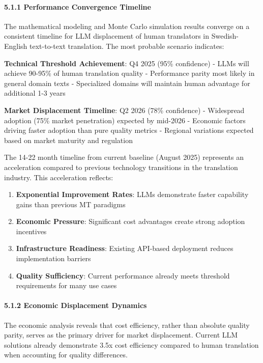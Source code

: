\documentclass[12pt,a4paper]{article}
\providecommand{\tightlist}{%
  \setlength{\itemsep}{0pt}\setlength{\parskip}{0pt}}
\begin{document}
{{{{\hypertarget{performance-convergence-timeline}{%
\paragraph{5.1.1 Performance Convergence
Timeline}\label{performance-convergence-timeline}}

The mathematical modeling and Monte Carlo simulation results converge on
a consistent timeline for LLM displacement of human translators in
Swedish-English text-to-text translation. The most probable scenario
indicates:

\textbf{Technical Threshold Achievement}: Q4 2025 (95\% confidence) -
LLMs will achieve 90-95\% of human translation quality - Performance
parity most likely in general domain texts - Specialized domains will
maintain human advantage for additional 1-3 years

\textbf{Market Displacement Timeline}: Q2 2026 (78\% confidence) -
Widespread adoption (75\% market penetration) expected by mid-2026 -
Economic factors driving faster adoption than pure quality metrics -
Regional variations expected based on market maturity and regulation

The 14-22 month timeline from current baseline (August 2025) represents
an acceleration compared to previous technology transitions in the
translation industry. This acceleration reflects:

\begin{enumerate}
\def\labelenumi{\arabic{enumi}.}
\tightlist
\item
  \textbf{Exponential Improvement Rates}: LLMs demonstrate faster
  capability gains than previous MT paradigms
\item
  \textbf{Economic Pressure}: Significant cost advantages create strong
  adoption incentives
\item
  \textbf{Infrastructure Readiness}: Existing API-based deployment
  reduces implementation barriers
\item
  \textbf{Quality Sufficiency}: Current performance already meets
  threshold requirements for many use cases
\end{enumerate}

\hypertarget{economic-displacement-dynamics}{%
\paragraph{5.1.2 Economic Displacement
Dynamics}\label{economic-displacement-dynamics}}

The economic analysis reveals that cost efficiency, rather than absolute
quality parity, serves as the primary driver for market displacement.
Current LLM solutions already demonstrate 3.5x cost efficiency compared
to human translation when accounting for quality differences.

}}}}
\end{document}

